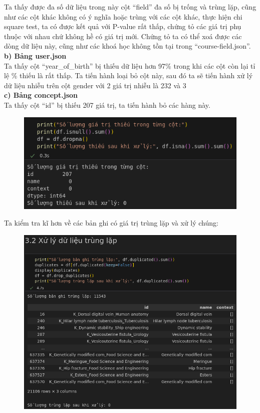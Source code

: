Ta thấy được đa số dữ liệu trong này cột “field” đa số bị trống và trùng lặp, cũng như các cột khác không có ý nghĩa hoặc trùng với các cột khác, thực hiện chi square test, ta có được kết quả với P-value rất thấp, chứng tỏ các giá trị phụ thuộc với nhau chứ không hề có giá trị mới. Chứng tỏ ta có thể xoá được các dòng dữ liệu này, cũng như các khoá học không tồn tại trong “course-field.json”.\\
\textbf{b) Bảng user.json}\\
Ta thấy cột “year\_of\_birth” bị thiếu dữ liệu hơn 97\% trong khi các cột còn lại tỉ lệ \% thiếu là rất thấp. Ta tiến hành loại bỏ cột này, sau đó ta sẽ tiến hành xử lý dữ liệu nhiễu trên cột gender với 2 giá trị nhiễu là 232 và 3\\
\textbf{c) Bảng concept.json}\\
Ta thấy cột “id” bị thiếu 207 giá trị, ta tiến hành bỏ các hàng này.\\
\begin{figure}[h]
    \centering
    \includegraphics[width=1\linewidth]{figures/46.png}
\end{figure}
\newpage
Ta kiểm tra kĩ hơn về các bản ghi có giá trị trùng lặp và xử lý chúng:\\
\begin{figure}[h]
    \centering
    \includegraphics[width=1\linewidth]{figures/47.png}
\end{figure}\\
